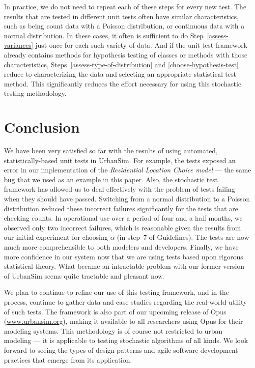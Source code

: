 \documentclass{sig-alternate}
\begin{document}
In practice, we do not need to repeat each of these steps for every new
test.  The results that are tested in different unit tests often have similar
characteristics, such as being count data with a Poisson distribution, or
continuous data with a normal distribution.  In these cases, it often is
sufficient to do Step~\ref{assess-variances} just once for each such
variety of data.  And if the unit test framework already contains methods
for hypothesis testing of classes or methods with those characteristics,
Steps~\ref{assess-type-of-distribution} and \ref{choose-hypothesis-test}
reduce to characterizing the data and selecting an appropriate statistical
test method.  This significantly reduces the effort necessary for using
this stochastic testing methodology.


\section{Conclusion}
\label{sec:conclusion}

We have been very satisfied so far with the results of using automated,
statistically-based unit tests in UrbanSim.  For example, the tests exposed an
error in our implementation of the \emph{Residential Location Choice model}
--- the same bug that we used as an example in this paper.  Also, the
stochastic test framework has allowed us to deal effectively with the problem
of tests failing when they should have passed. Switching from a normal
distribution to a Poisson distribution reduced these incorrect failures
significantly for the tests that are checking counts.  In operational use
over a period of 
four and a half
months, we observed only two incorrect failures, which is reasonable given
the results from our
initial experiment for choosing $\alpha$ (in step~7 of
Guidelines). The tests are now much more comprehensible to both modelers and
developers.  Finally, we have more confidence in our system now that we are
using tests based upon rigorous statistical theory.  What became an
intractable problem with our former version of UrbanSim seems quite tractable
and pleasant now.

We plan to continue to refine our use of this testing framework, and in the
process, continue to gather data and case studies regarding the real-world
utility of such tests.  The framework is also part of our upcoming
release of Opus (\url{www.urbansim.org}), 
making it available to all researchers using Opus for
their modeling systems.  This methodology is of course not restricted to
urban modeling --- it is applicable to testing stochastic algorithms of all
kinds.  We look forward to seeing the types of design patterns and agile
software development practices that emerge from its application.
\end{document}
